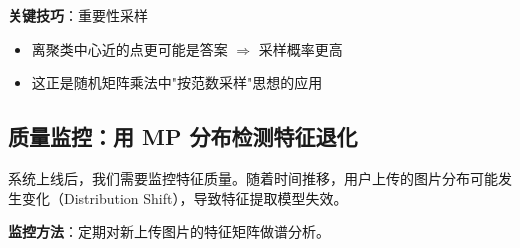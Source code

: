 \documentclass[11pt,a4paper]{ctexart}
\theoremstyle{definition}
\theoremstyle{remark}
\begin{document}
\textbf{关键技巧}：重要性采样
\begin{itemize}
    \item 离聚类中心近的点更可能是答案 $\Rightarrow$ 采样概率更高
    \item 这正是随机矩阵乘法中"按范数采样"思想的应用
\end{itemize}

\subsection{质量监控：用 MP 分布检测特征退化}

系统上线后，我们需要监控特征质量。随着时间推移，用户上传的图片分布可能发生变化（Distribution Shift），导致特征提取模型失效。

\textbf{监控方法}：定期对新上传图片的特征矩阵做谱分析。
\end{document}
